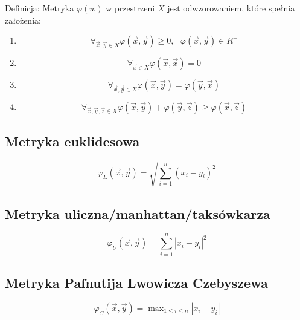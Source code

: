 \documentclass[a4paper,10pt]{article}
\begin{document}
Definicja:
Metryka $\varphi(w)$ w przestrzeni $X$ jest odwzorowaniem, które spełnia założenia:
\begin{enumerate}
 \item \begin{equation}
         \mathop{\forall}_{\overrightarrow{x}, \overrightarrow{y} \in X} \varphi(\overrightarrow{x}, \overrightarrow{y}) \geq 0, \; \, \: \varphi(\overrightarrow{x}, \overrightarrow{y}) \in R^{+}
       \end{equation}
 \item \begin{equation}
         \mathop{\forall}_{\overrightarrow{x} \in X} \varphi(\overrightarrow{x}, \overrightarrow{x}) = 0
       \end{equation}
 \item \begin{equation}
         \mathop{\forall}_{\overrightarrow{x}, \overrightarrow{y} \in X} \varphi(\overrightarrow{x}, \overrightarrow{y})  = \varphi(\overrightarrow{y}, \overrightarrow{x})
       \end{equation}
 \item \begin{equation}
         \mathop{\forall}_{\overrightarrow{x}, \overrightarrow{y}, \overrightarrow{z} \in X} \varphi(\overrightarrow{x}, \overrightarrow{y})  + \varphi(\overrightarrow{y}, \overrightarrow{z}) \geq \varphi(\overrightarrow{x}, \overrightarrow{z})
       \end{equation}
\end{enumerate}
\subsection{Metryka euklidesowa}
\begin{equation}
  \varphi_E(\overrightarrow{x}, \overrightarrow{y}) = \sqrt{\sum_{i = 1}^n (x_i - y_i)^2}
\end{equation}
\subsection{Metryka uliczna/manhattan/taksówkarza}
\begin{equation}
  \varphi_U(\overrightarrow{x}, \overrightarrow{y}) = \sum_{i = 1}^n |x_i - y_i|^2
\end{equation}
\subsection{Metryka Pafnutija Lwowicza Czebyszewa}
\begin{equation}
  \varphi_C(\overrightarrow{x}, \overrightarrow{y}) = \mathop{\mbox{max}}_{1 \leq i \leq n} |x_i - y_i|
\end{equation}
\end{document}
